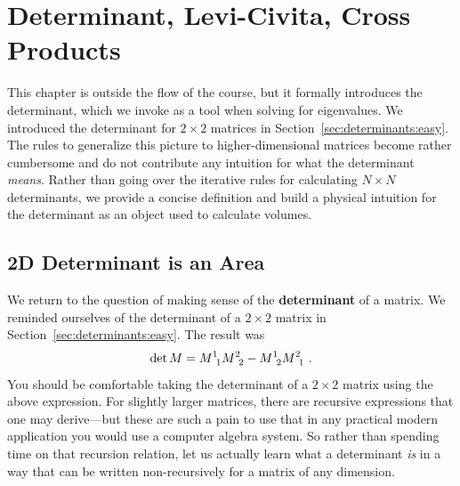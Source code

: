 \chapter{Determinant, Levi-Civita, Cross Products}
\label{ch:determinant}

This chapter is outside the flow of the course, but it formally introduces the determinant, which we invoke as a tool when solving for eigenvalues. We introduced the determinant for $2\times 2$ matrices in Section~\ref{sec:determinants:easy}. The rules to generalize this picture to higher-dimensional matrices become rather cumbersome and do not contribute any intuition for what the determinant \emph{means}. Rather than going over the iterative rules for calculating $N\times N$ determinants, we provide a concise definition and build a physical intuition for the determinant as an object used to calculate volumes. 


\section{2D Determinant is an Area}
\label{sec:determinants:2D}

We return to the question of making sense of the \textbf{determinant} of a matrix. We reminded ourselves of the determinant of a $2\times 2$ matrix in Section~\ref{sec:determinants:easy}. The result was
\begin{align}
    \det M = M\aij{1}{1}M\aij{2}{2} - M\aij{1}{2} M\aij{2}{1} \ .
    \label{eq:detM:2:expand}
\end{align}
You should be comfortable taking the determinant of a $2\times 2$ matrix using the above expression. For slightly larger matrices, there are recursive expressions that one may derive---but these are such a pain to use that in any practical modern application you would use a computer algebra system. So rather than spending time on that recursion relation, let us actually learn what a determinant \emph{is} in a way that can be written non-recursively for a matrix of any dimension.

